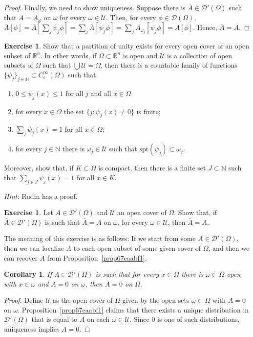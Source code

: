 \documentclass[a4paper,9pt]{amsart}
\newcommand{\scr}[1]{\mathscr{#1}}
\newcommand{\N}{\mathbb{N}}	%
\newcommand{\R}{\mathbb{R}}	%
\newcommand{\spt}{\mathrm{spt}}
\theoremstyle{plain}
\newtheorem{corollary}[proposition]{Corollary}
\theoremstyle{definition}
\newtheorem{exercise}[proposition]{Exercise}%
\theoremstyle{remark}
\begin{document}
\begin{proof}
	Finally, we need to show uniqueness.
	Suppose there is $\bar A\in\scr D'(\Omega)$ such that $\bar A=A_\omega$ on $\omega$ for every $\omega\in\scr U$.
	Then, for every $\phi\in \scr D(\Omega)$,
	$\bar A[\phi] = \bar A[\sum_j \psi_j\phi]
	= \sum_j \bar A[\psi_j\phi]
	= \sum_j A_{\omega_j}[\psi_j\phi]
	= A[\phi]$.
	Hence, $\bar A=A$.
\end{proof}

\begin{exercise}
	Show that a partition of unity exists for every open cover of an open subset of $\R^n$.
	In other words, if $\Omega\subset\R^n$ is open and $\scr U$ is a collection of open subsets of $\Omega$ such that $\bigcup\scr U = \Omega$, 
	then there is a countable family of functions $\{\psi_j\}_{j\in\N}\subset C^\infty_c(\Omega)$ 
	such that
	\begin{enumerate}
	\item $0\le \psi_j(x)\le 1$ for all $j$ and all $x\in\Omega$
	\item for every $x\in\Omega$ the set $\{j:\psi_j(x)\neq0\}$ is finite; 
	\item $\sum_j\psi_j(x) = 1$ for all $x\in \Omega$;
	\item for every $j\in\N$ there is $\omega_j\in\scr U$ such that $\spt(\psi_j)\subset\omega_j$.
	\end{enumerate}
	
	Moreover, show that, if $K\subset \Omega$ is compact, then there is a finite set $J\subset\N$ such that $\sum_{j\in J}\psi_j(x) = 1$ for all $x\in K$.
	
	{\it Hint:} Rudin has a proof.
\end{exercise}

\begin{exercise}
	Let $A\in\scr D'(\Omega)$ and $\scr U$ an open cover of $\Omega$.
	Show that, if $\bar A\in\scr D'(\Omega)$ is such that $\bar A = A$ on $\omega$, for every $\omega\in\scr U$, then $\bar A=A$.

	The meaning of this exercise is as follows:
	If we start from some $A\in\scr D'(\Omega)$, then we can localize $A$ to each open subset of some given cover of $\Omega$, and then we can recover $A$ from Proposition~\ref{prop67eaabf1}.
\end{exercise}

\begin{corollary}\label{cor67ea99a6}
	If $A\in \scr D'(\Omega)$ is such that for every $x\in\Omega$ there is $\omega\subset\Omega$ open with $x\in\omega$ and $A=0$ on $\omega$, then $A=0$ on $\Omega$.
\end{corollary}
\begin{proof}
	Define $\scr U$ as the open cover of $\Omega$ given by the open sets $\omega\subset\Omega$ with $A=0$ on $\omega$.
	Proposition~\ref{prop67eaabf1} claims that there exists a unique distribution in $\scr D'(\Omega)$ that is equal to $A$ on each $\omega\in\scr U$.
	Since $0$ is one of such distributions, uniqueness implies $A=0$.
\end{proof}
\end{document}
